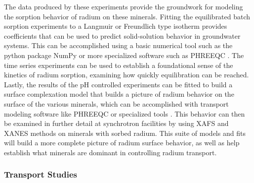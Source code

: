 \documentclass[twoside,12pt,titlepage]{article}
\begin{document}
\par The data produced by these experiments provide the groundwork for modeling the sorption behavior of radium on these minerals. Fitting the equilibrated batch sorption experiments to a Langmuir or Freundlich type isotherm provides coefficients that can be used to predict solid-solution behavior in groundwater systems. This can be accomplished using a basic numerical tool such as the python package NumPy or more specialized software such as PHREEQC \cite{PHREEQC}. The time series experiments can be used to establish a foundational sense of the kinetics of radium sorption, examining how quickly equilibration can be reached. Lastly, the results of the pH controlled experiments can be fitted to build a surface complexation model that builds a picture of radium behavior on the surface of the various minerals, which can be accomplished with transport modeling software like PHREEQC or specialized tools \cite{Dixit2003}. This behavior can then be examined in further detail at synchrotron facilities by using XAFS and XANES methods on minerals with sorbed radium. This suite of models and fits will build a more complete picture of radium surface behavior, as well as help establish what minerals are dominant in controlling radium transport.

\subsubsection{Transport Studies}
\end{document}
